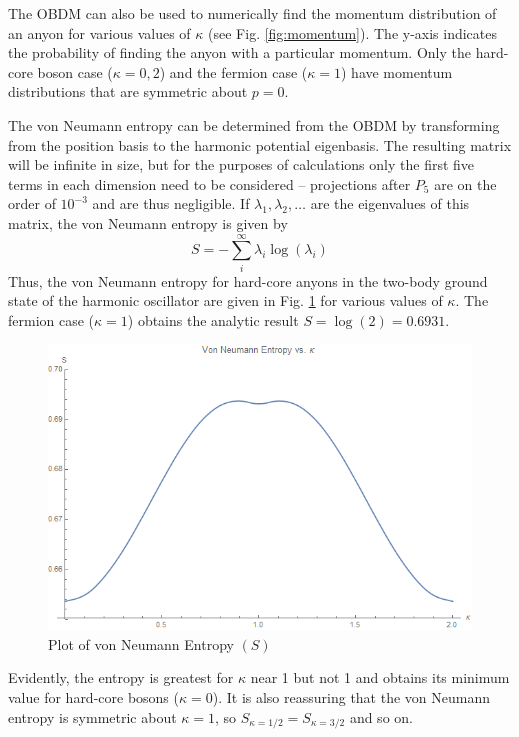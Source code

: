 \documentclass[onecolumn,english,aps,pra]{revtex4}
\begin{document}
The OBDM can also be used to numerically find the momentum distribution of an anyon for various values of $\kappa$ (see Fig. \ref{fig:momentum}). The y-axis indicates the probability of finding the anyon with a particular momentum. Only the hard-core boson case ($\kappa = 0, 2$) and the fermion case ($\kappa = 1$) have momentum distributions that are symmetric about $p = 0$.

The von Neumann entropy can be determined from the OBDM by transforming from the position basis to the harmonic potential eigenbasis. The resulting matrix will be infinite in size, but for the purposes of calculations only the first five terms in each dimension need to be considered -- projections after $P_5$ are on the order of $10^{-3}$ and are thus negligible. If $\lambda_1, \lambda_2,\ldots$ are the eigenvalues of this matrix, the von Neumann entropy is given by
\[ S =  -\sum_i^\infty \lambda_i \log(\lambda_i) \]
Thus, the von Neumann entropy for hard-core anyons in the two-body ground state of the harmonic oscillator are given in Fig. \ref{fig:entropy} for various values of $\kappa$. The fermion case ($\kappa = 1$) obtains the analytic result $S = \log(2) = 0.6931$. 

\begin{figure}[h]
\includegraphics[scale=.5]{"Plots/EntropyPlot"}
\caption{Plot of von Neumann Entropy $(S)$}
\label{fig:entropy}
\end{figure}

Evidently, the entropy is greatest for $\kappa$ near 1 but not 1 and obtains its minimum value for hard-core bosons ($\kappa = 0$). It is also reassuring that the von Neumann entropy is symmetric about $\kappa = 1$, so $S_{\kappa = 1/2} = S_{\kappa = 3/2}$ and so on.
\end{document}
